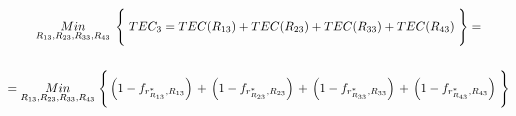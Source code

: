 \documentclass[
  11pt,
  a4paper,
]{article}
\begin{document}
\begin{gather*}
\underset{R_{13}  ,  R_{23},  R_{33},  R_{43}}  {Min} \hspace{0.15cm}  \Biggl\{\hspace{0.1cm} TEC_3 = TEC(R_{13})  +  TEC(R_{23}) +  TEC(R_{33}) +  TEC(R_{43}) \hspace{0.1cm} \Biggl\}   \hspace{0.1cm} =   \\ \\
= \underset{R_{13}  ,  R_{23},  R_{33},  R_{43}}  {Min} \hspace{0.1cm}  \Biggl\{ \hspace{0.05cm}   \left( 1 - f_{r^*_{R_{13}} , R_{13}} \right)   \hspace{0.05cm} +  \hspace{0.05cm}    \left( 1 - f_{r^*_{R_{23}} , R_{23}} \right) \hspace{0.05cm} +  \hspace{0.05cm}    \left( 1 - f_{r^*_{R_{33}} , R_{33}} \right)  \hspace{0.05cm} +  \hspace{0.05cm}    \left( 1 - f_{r^*_{R_{43}} , R_{43}} \right)  \hspace{0.05cm}   \Biggl\}  \\ \\    

\end{gather*}
\end{document}
